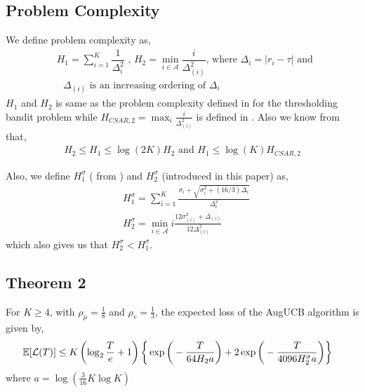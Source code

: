 \subsection{Problem Complexity}

We define problem complexity as,
\begin{align*}
& H_{1} = \sum_{i=1}^{K}\dfrac{1}{\Delta_{i}^{2}} \text{ ,   } H_{2}=\min_{i\in \mathcal{A}}\dfrac{i}{{\Delta_{(i)}^{2}}} \text{, where } \Delta_{i}=|r_{i}-\tau| \text{ and }\\
& \text{ $\Delta_{(i)}$ is an increasing ordering of $\Delta_i$ }
\end{align*}
$H_1$ and $H_2$ is same as the problem complexity defined in \cite{locatelli2016optimal} for the thresholding bandit problem while $H_{CSAR,2}=\max_{i}\frac{i}{\Delta_{(i)}^2}$ is defined in \cite{chen2014combinatorial}. Also we know from \cite{locatelli2016optimal} that,
\begin{align*}
H_{2}\leq H_{1}\leq \log(2K)H_{2} \text{ and } H_1 \leq \log(K)H_{CSAR,2}
\end{align*}

Also, we define $H_{1}^{\sigma}$ ( from \cite{gabillon2011multi}) and $H_{2}^{\sigma}$ (introduced in this paper) as,
\begin{align*}
& H_{1}^{\sigma}=\sum_{i=1}^{K}\frac{\sigma_{i}+\sqrt{\sigma_{i}^{2}+(16/3)\Delta_{i}}}{\Delta_{i}^{2}}\\
& H_{2}^{\sigma}=\min_{i\in \mathcal{A}} i\frac{12\sigma_{(i)}^{2} + \Delta_{(i)}}{12\Delta_{(i)}^{2}}
\end{align*}
which also gives us that $H_{2}^{\sigma} < H_{1}^{\sigma}$.


\subsection{Theorem 2}

\begin{theorem}
\label{Result:Theorem:2}
For $K\geq 4$, with $\rho_{\mu}=\frac{1}{8}$ and $\rho_v=\frac{1}{3}$,
the expected loss of the AugUCB algorithm is given by,
\begin{align*}
&\mathbb{E}[\mathcal{L}(T)]
 \leq K\left(\log_2\frac{T}{e}+1\right)\bigg\lbrace\exp\bigg( -\frac{T}{ 64 H_2 a}\bigg)
 + 2\exp\bigg(- \frac{T}{4096 H_{2}^{\sigma} a} \bigg)\bigg\rbrace
\end{align*}
where $a=\log(\frac{3}{16} K\log K)$
\end{theorem}



